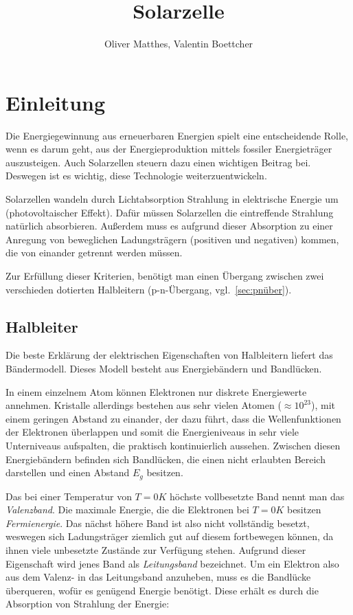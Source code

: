 \documentclass[slug=SZ, room=Hermann-Krone-Bau\,\ Labor\ 1.25, supervisor=Martin\ Kroll]{../../Lab_Report_LaTeX/lab_report}
\title{Solarzelle}
\author{Oliver Matthes, Valentin Boettcher}
\begin{document}
\maketitle

\section{Einleitung}
\label{sec:einl}

Die Energiegewinnung aus erneuerbaren Energien spielt eine entscheidende Rolle, wenn es darum geht,
aus der Energieproduktion mittels fossiler Energieträger auszusteigen.
Auch Solarzellen steuern dazu einen wichtigen Beitrag bei. Deswegen ist es wichtig, diese
Technologie weiterzuentwickeln.

Solarzellen wandeln durch Lichtabsorption Strahlung in elektrische Energie um (photovoltaischer Effekt).
Dafür müssen Solarzellen die eintreffende Strahlung natürlich absorbieren.
Außerdem muss es aufgrund dieser Absorption zu einer Anregung von beweglichen Ladungsträgern
(positiven und negativen) kommen, die von einander getrennt werden müssen.

Zur Erfüllung dieser Kriterien, benötigt man einen Übergang zwischen zwei verschieden dotierten
Halbleitern (p-n-Übergang, vgl.~\ref{sec:pnüber}).

\subsection{Halbleiter}
\label{sec:halbleiter}

Die beste Erklärung der elektrischen Eigenschaften von Halbleitern liefert das Bändermodell.
Dieses Modell besteht aus Energiebändern und Bandlücken.

In einem einzelnem Atom können Elektronen nur diskrete Energiewerte annehmen.
Kristalle allerdings bestehen aus sehr vielen Atomen (\(\approx 10^{23}\)), mit einem geringen Abstand zu einander,
der dazu führt, dass die Wellenfunktionen der Elektronen überlappen und somit die Energieniveaus in sehr
viele Unterniveaus aufspalten, die praktisch kontinuierlich aussehen.
Zwischen diesen Energiebändern befinden sich Bandlücken, die einen nicht erlaubten Bereich darstellen und
einen Abstand \(E_g\) besitzen.

Das bei einer Temperatur von  \(T=0 K\)  höchste vollbesetzte Band nennt man das \emph{Valenzband}.
Die maximale Energie, die die Elektronen bei \(T=0 K\) besitzen \emph{Fermienergie}. Das nächst höhere Band ist
also nicht vollständig besetzt, weswegen sich Ladungsträger ziemlich gut auf diesem fortbewegen können, da
ihnen viele unbesetzte Zustände zur Verfügung stehen.
Aufgrund dieser Eigenschaft wird jenes Band als \emph{Leitungsband} bezeichnet.
Um ein Elektron also aus dem Valenz- in das Leitungsband anzuheben, muss es die Bandlücke überqueren,
wofür es genügend Energie benötigt. Diese erhält es durch die Absorption von Strahlung der Energie:
\end{document}
